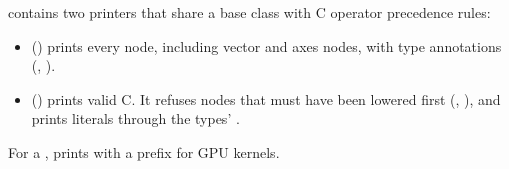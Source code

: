  contains two printers that share a base class with C operator
precedence rules:
\begin{itemize}
  \item {} () prints every node, including vector and axes
        nodes, with type annotations (\code{[1.0: float64]}, ).
  \item {} () prints valid C. It refuses nodes that must
        have been lowered first (, ), and prints
        literals through the types' .
\end{itemize}
For a ,  prints  with a
 prefix for GPU kernels.
